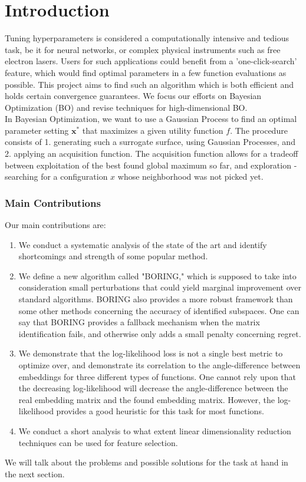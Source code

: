 \chapter{Introduction}

Tuning hyperparameters is considered a computationally intensive and tedious task, be it for neural networks, or complex physical instruments such as free electron lasers.
Users for such applications could benefit from a 'one-click-search' feature, which would find optimal parameters in a few function evaluations as possible.
This project aims to find such an algorithm which is both efficient and holds certain convergence guarantees.
We focus our efforts on Bayesian Optimization (BO) and revise techniques for high-dimensional BO. \\

In Bayesian Optimization, we want to use a Gaussian Process to find an optimal parameter setting $\mathbf{x^*}$ that maximizes a given utility function $f$.
The procedure consists of 1. generating such a surrogate surface, using Gaussian Processes, and 2. applying an acquisition function.
The acquisition function allows for a tradeoff between exploitation of the best found global maximum so far, and exploration - searching for a configuration $x$ whose neighborhood was not picked yet.\\

\subsection{Main Contributions}

Our main contributions are:

\begin{enumerate}
\item We conduct a systematic analysis of the state of the art and identify shortcomings and strength of some popular method.
\item We define a new algorithm called "BORING," which is supposed to take into consideration small perturbations that could yield marginal improvement over standard algorithms.
BORING also provides a more robust framework than some other methods concerning the accuracy of identified subspaces.
One can say that BORING provides a fallback mechanism when the matrix identification fails, and otherwise only adds a small penalty concerning regret.
\item We demonstrate that the log-likelihood loss is not a single best metric to optimize over, and demonstrate its correlation to the angle-difference between embeddings for three different types of functions.
One cannot rely upon that the decreasing log-likelihood will decrease the angle-difference between the real embedding matrix and the found embedding matrix. However, the log-likelihood provides a good heuristic for this task for most functions.
\item We conduct a short analysis to what extent linear dimensionality reduction techniques can be used for feature selection.
\end{enumerate}

We will talk about the problems and possible solutions for the task at hand in the next section.

